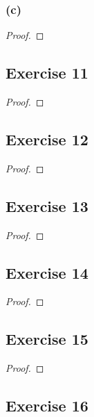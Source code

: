 \documentclass[14pt]{extarticle}
\begin{document}
\subsubsection{(c)}

\begin{proof}

\end{proof}

\subsection{Exercise 11}

\begin{proof}

\end{proof}

\subsection{Exercise 12}

\begin{proof}

\end{proof}

\subsection{Exercise 13}

\begin{proof}

\end{proof}

\subsection{Exercise 14}

\begin{proof}

\end{proof}

\subsection{Exercise 15}

\begin{proof}

\end{proof}

\subsection{Exercise 16}
\end{document}
